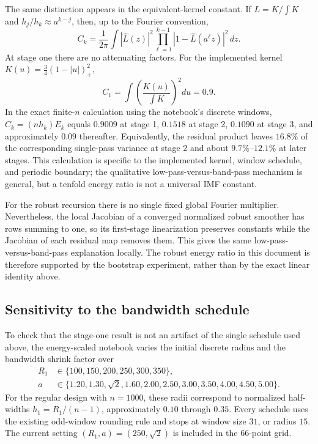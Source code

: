 \documentclass[11pt]{article}
\begin{document}
The same distinction appears in the equivalent-kernel constant. If
$L=K/\int K$ and $h_j/h_k\approx a^{k-j}$, then, up to the Fourier convention,
\[
C_k=\frac{1}{2\pi}\int |\widehat L(z)|^2
\prod_{\ell=1}^{k-1}|1-\widehat L(a^\ell z)|^2\,dz.
\]
At stage one there are no attenuating factors. For the implemented kernel
$K(u)=\tfrac34(1-|u|)^2_+$,
\[
C_1=\int\left(\frac{K(u)}{\int K}\right)^2du=0.9.
\]
In the exact finite-$n$ calculation using the notebook's discrete windows,
$C_k=(nh_k)E_k$ equals $0.9009$ at stage 1, $0.1518$ at stage 2, $0.1090$ at
stage 3, and approximately $0.09$ thereafter. Equivalently, the residual
product leaves $16.8\%$ of the corresponding single-pass variance at stage 2
and about $9.7\%$--$12.1\%$ at later stages. This calculation is specific to
the implemented kernel, window schedule, and periodic boundary; the qualitative
low-pass-versus-band-pass mechanism is general, but a tenfold energy ratio is
not a universal IMF constant.

For the robust recursion there is no single fixed global Fourier multiplier.
Nevertheless, the local Jacobian of a converged normalized robust smoother has
rows summing to one, so its first-stage linearization preserves constants while
the Jacobian of each residual map removes them. This gives the same
low-pass-versus-band-pass explanation locally. The robust energy ratio in this
document is therefore supported by the bootstrap experiment, rather than by the
exact linear identity above.

\subsection{Sensitivity to the bandwidth schedule}

To check that the stage-one result is not an artifact of the single schedule
used above, the energy-scaled notebook varies the initial discrete radius
and the bandwidth shrink factor over
\[
\begin{aligned}
R_1&\in\{100,150,200,250,300,350\},\\
a&\in\{1.20,1.30,\sqrt{2},1.60,2.00,2.50,3.00,3.50,4.00,4.50,5.00\}.
\end{aligned}
\]
For the regular design with \(n=1000\), these radii correspond to normalized
half-widths \(h_1=R_1/(n-1)\), approximately \(0.10\) through \(0.35\).
Every schedule uses the existing odd-window rounding rule and stops at window
size \(31\), or radius \(15\). The current setting
\((R_1,a)=(250,\sqrt{2})\) is included in the 66-point grid.
\end{document}

